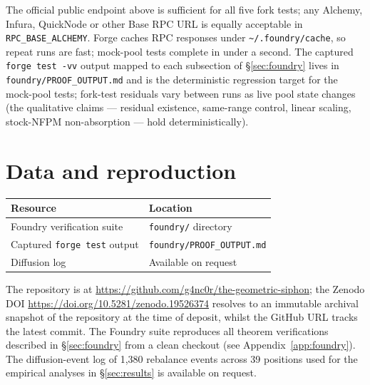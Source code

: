 \documentclass[11pt,a4paper]{article}
\begin{document}
The official public endpoint above is sufficient for all five fork tests; any Alchemy, Infura, QuickNode or other Base RPC URL is equally acceptable in \texttt{RPC\_BASE\_ALCHEMY}. Forge caches RPC responses under \texttt{\textasciitilde/.foundry/cache}, so repeat runs are fast; mock-pool tests complete in under a second. The captured \texttt{forge test -vv} output mapped to each subsection of \S\ref{sec:foundry} lives in \texttt{foundry/PROOF\_OUTPUT.md} and is the deterministic regression target for the mock-pool tests; fork-test residuals vary between runs as live pool state changes (the qualitative claims --- residual existence, same-range control, linear scaling, stock-NFPM non-absorption --- hold deterministically).

\enlargethispage{2\baselineskip}
\section{Data and reproduction}\label{app:reproduction}

\begin{table}[H]
\centering
\begin{tabular}{@{}ll@{}}
\toprule
Resource & Location \\
\midrule
Foundry verification suite & \texttt{foundry/} directory \\
Captured \texttt{forge test} output & \texttt{foundry/PROOF\_OUTPUT.md} \\
Diffusion log & Available on request \\
\bottomrule
\end{tabular}
\end{table}

The repository is at \url{https://github.com/g4nc0r/the-geometric-siphon}; the Zenodo DOI \url{https://doi.org/10.5281/zenodo.19526374} resolves to an immutable archival snapshot of the repository at the time of deposit, whilst the GitHub URL tracks the latest commit. The Foundry suite reproduces all theorem verifications described in \S\ref{sec:foundry} from a clean checkout (see Appendix~\ref{app:foundry}). The diffusion-event log of 1{,}380 rebalance events across 39 positions used for the empirical analyses in \S\ref{sec:results} is available on request.
\end{document}
